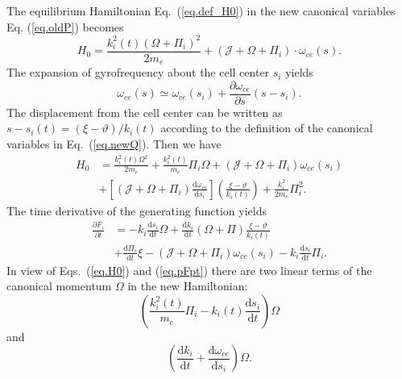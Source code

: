 The equilibrium Hamiltonian Eq.~(\ref{eq.def_H0})
in the new canonical variables Eq. (\ref{eq.oldP}) 
becomes
\begin{equation}\label{eq.ctH0}
     H_0 = \frac{k_{i}^{2}(t)\left(\Omega+\Pi_{i}\right)^{2}}{2 m_{e}}+\left(\mathcal{J}+\Omega+\Pi_{i}\right) \cdot \omega_{c e}(s). 
\end{equation}
The expansion of gyrofrequency about the cell center $s_i$ yields
\begin{equation}
\omega_{c e}(s) \simeq \omega_{c e}(s_i) +  \frac{\partial \omega_{ce}}{\partial s} (s-s_i).
\end{equation}
The displacement from the cell center can be written as 
$s - s_{i}(t) = (\xi-\vartheta)/k_{i}(t)$ according to the definition of the canonical variables in Eq.~(\ref{eq.newQ}). 
Then we have 
\begin{equation}\label{eq.H0}
\begin{aligned}
  H_0 &=\frac{k_{i}^{2}(t) \Omega^{2}}{2 m_{e}}+\frac{k_{i}^{2}(t)}{m_{e}} \Pi_{i} \Omega+(\mathcal{J} + \Omega + \Pi_i)\omega_{ce}(s_i)
  \\
  &+\left[\left(\mathcal{J} +\Omega+\Pi_{i}\right)\frac{\mathrm{d}\omega_{c e}}{\mathrm{d}s_{i}} \right]\left(\frac{\xi-\vartheta}{k_{i}(t)}\right) +\frac{k_i^2}{2m_e} \Pi_i^2.
    \end{aligned}
\end{equation}
The time derivative of the generating function yields
\begin{equation}\label{eq.pFpt}
    \begin{aligned}
    \frac{\partial F_i}{\partial t} & =- k_i \frac{\mathrm{d} s_i}{\mathrm{d} t}\Omega +\frac{\mathrm{d} k_i}{\mathrm{d} t}(\Omega + \Pi) \frac{\xi-\vartheta}{k_i(t)} 
    \\
    & + \frac{\mathrm{d} \Pi_i}{\mathrm{d} t} \xi - (\mathcal{J} + \Omega + \Pi_i)\omega_{ce}(s_i)- k_i \frac{\mathrm{d} s_i}{\mathrm{d}t}\Pi_i. 
    \end{aligned}
\end{equation}
In view of Eqs.~(\ref{eq.H0}) and (\ref{eq.pFpt}) there are two linear terms of the canonical momentum $\Omega$ 
in the new Hamiltonian: $$\left(\frac{k_{i}^{2}(t)}{m_{e}} \Pi_{i}-k_i(t) \frac{\mathrm{d} s_i}{\mathrm{d} t}\right) \Omega $$
and 
$$\left(\frac{\mathrm{d}k_{i}}{\mathrm{d}t}+\frac{\mathrm{d}\omega_{c e}}{\mathrm{d}s_{i}}\right)\Omega.$$
